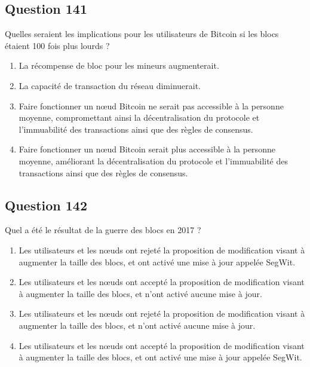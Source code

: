 \documentclass[12pt,a4paper]{article}
\begin{document}
\bigskip


\subsection*{Question 141}
Quelles seraient les implications pour les utilisateurs de Bitcoin si les blocs étaient 100 fois plus lourds ?

\begin{enumerate}[label=\Alph*., leftmargin=*]
\item La récompense de bloc pour les mineurs augmenterait.
\item La capacité de transaction du réseau diminuerait.
\item Faire fonctionner un nœud Bitcoin ne serait pas accessible à la personne moyenne, compromettant ainsi la décentralisation du protocole et l'immuabilité des transactions ainsi que des règles de consensus.
\item Faire fonctionner un nœud Bitcoin serait plus accessible à la personne moyenne, améliorant la décentralisation du protocole et l'immuabilité des transactions ainsi que des règles de consensus.
\end{enumerate}

\bigskip


\subsection*{Question 142}
Quel a été le résultat de la guerre des blocs en 2017 ?

\begin{enumerate}[label=\Alph*., leftmargin=*]
\item Les utilisateurs et les nœuds ont rejeté la proposition de modification visant à augmenter la taille des blocs, et ont activé une mise à jour appelée SegWit.
\item Les utilisateurs et les nœuds ont accepté la proposition de modification visant à augmenter la taille des blocs, et n'ont activé aucune mise à jour.
\item Les utilisateurs et les nœuds ont rejeté la proposition de modification visant à augmenter la taille des blocs, et n'ont activé aucune mise à jour.
\item Les utilisateurs et les nœuds ont accepté la proposition de modification visant à augmenter la taille des blocs, et ont activé une mise à jour appelée SegWit.
\end{enumerate}

\bigskip
\end{document}
